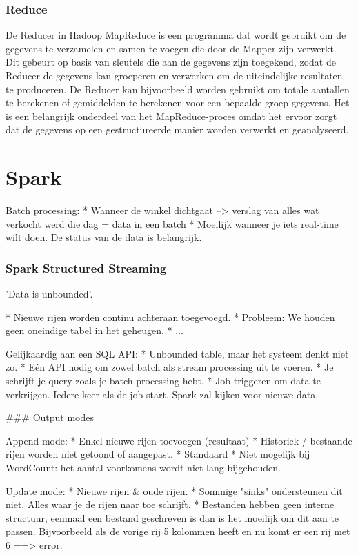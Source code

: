 \documentclass[a4paper,10pt,twoside]{report}
\begin{document}
\subsection{Reduce}

De Reducer in Hadoop MapReduce is een programma dat wordt gebruikt om de gegevens te verzamelen en samen te voegen die door de Mapper zijn verwerkt. Dit gebeurt op basis van sleutels die aan de gegevens zijn toegekend, zodat de Reducer de gegevens kan groeperen en verwerken om de uiteindelijke resultaten te produceren. De Reducer kan bijvoorbeeld worden gebruikt om totale aantallen te berekenen of gemiddelden te berekenen voor een bepaalde groep gegevens. Het is een belangrijk onderdeel van het MapReduce-proces omdat het ervoor zorgt dat de gegevens op een gestructureerde manier worden verwerkt en geanalyseerd.

\chapter{Spark}

Batch processing: 
* Wanneer de winkel dichtgaat --> verslag van alles wat verkocht werd die dag = data in een batch
* Moeilijk wanneer je iets real-time wilt doen. De status van de data is belangrijk.

\subsection{Spark Structured Streaming}

'Data is unbounded'.

* Nieuwe rijen worden continu achteraan toegevoegd.
* Probleem: We houden geen oneindige tabel in het geheugen. 
* ...

Gelijkaardig aan een SQL API:
* Unbounded table, maar het systeem denkt niet zo.
* Eén API nodig om zowel batch als stream processing uit te voeren.
* Je schrijft je query zoals je batch processing hebt.
* Job triggeren om data te verkrijgen. Iedere keer als de job start, Spark zal kijken voor nieuwe data.

### Output modes

Append mode:
* Enkel nieuwe rijen toevoegen (resultaat)
* Historiek / bestaande rijen worden niet getoond of aangepast.
* Standaard
* Niet mogelijk bij WordCount: het aantal voorkomens wordt niet lang bijgehouden.

Update mode:
* Nieuwe rijen & oude rijen.
* Sommige "sinks" ondersteunen dit niet. Alles waar je de rijen naar toe schrijft.
* Bestanden hebben geen interne structuur, eenmaal een bestand geschreven is dan is het moeilijk om dit aan te passen. Bijvoorbeeld als de vorige rij 5 kolommen heeft en nu komt er een rij met 6 ==> error.
\end{document}
